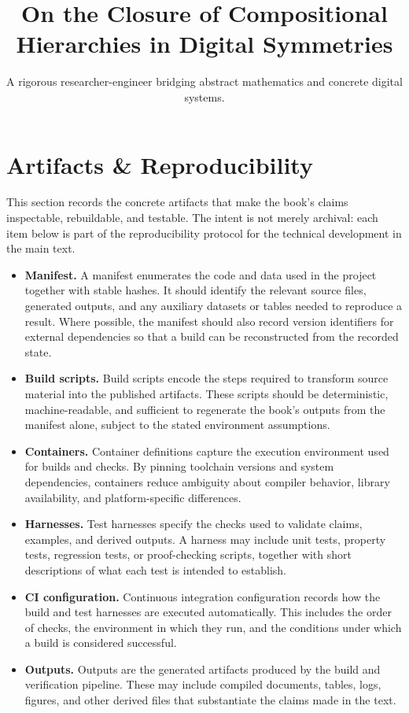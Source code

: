\documentclass[11pt]{article}
\title{On the Closure of Compositional Hierarchies in Digital Symmetries}
\author{A rigorous researcher-engineer bridging abstract mathematics and concrete digital systems.}
\begin{document}
\section*{Artifacts \& Reproducibility}

This section records the concrete artifacts that make the book's claims inspectable, rebuildable, and testable. The intent is not merely archival: each item below is part of the reproducibility protocol for the technical development in the main text.

\begin{itemize}
  \item \textbf{Manifest.} A manifest enumerates the code and data used in the project together with stable hashes. It should identify the relevant source files, generated outputs, and any auxiliary datasets or tables needed to reproduce a result. Where possible, the manifest should also record version identifiers for external dependencies so that a build can be reconstructed from the recorded state.

  \item \textbf{Build scripts.} Build scripts encode the steps required to transform source material into the published artifacts. These scripts should be deterministic, machine-readable, and sufficient to regenerate the book's outputs from the manifest alone, subject to the stated environment assumptions.

  \item \textbf{Containers.} Container definitions capture the execution environment used for builds and checks. By pinning toolchain versions and system dependencies, containers reduce ambiguity about compiler behavior, library availability, and platform-specific differences.

  \item \textbf{Harnesses.} Test harnesses specify the checks used to validate claims, examples, and derived outputs. A harness may include unit tests, property tests, regression tests, or proof-checking scripts, together with short descriptions of what each test is intended to establish.

  \item \textbf{CI configuration.} Continuous integration configuration records how the build and test harnesses are executed automatically. This includes the order of checks, the environment in which they run, and the conditions under which a build is considered successful.

  \item \textbf{Outputs.} Outputs are the generated artifacts produced by the build and verification pipeline. These may include compiled documents, tables, logs, figures, and other derived files that substantiate the claims made in the text.
\end{itemize}
\end{document}
